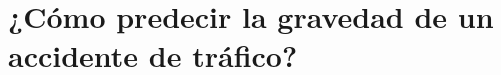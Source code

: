 \documentclass{uathesis-es}
\begin{document}



\chapter{¿Cómo predecir la gravedad de un accidente de tráfico?}
\end{document}
